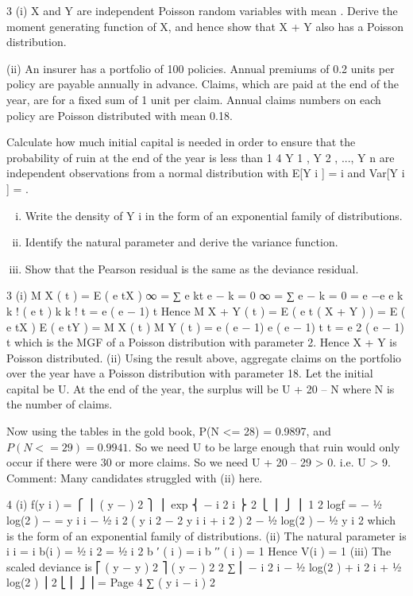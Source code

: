 \documentclass[a4paper,12pt]{article}
\begin{document}
\begin{enumerate}
3
(i) X and Y are independent Poisson random variables with mean \lambda. Derive the moment generating function of X, and hence show that X + Y also has a Poisson distribution.

(ii) An insurer has a portfolio of 100 policies. Annual premiums of 0.2 units per policy are payable annually in advance. Claims, which are paid at the end of the year, are for a fixed sum of 1 unit per claim. Annual claims numbers on each policy are Poisson distributed with mean 0.18.

Calculate how much initial capital is needed in order to ensure that the probability of ruin at the end of the year is less than 1%
4
Y 1 , Y 2 , ..., Y n are independent observations from a normal distribution with E[Y i ] = \mu i
and Var[Y i ] =  .
\begin{enumerate}[(i)]
\item  Write the density of Y i in the form of an exponential family of distributions. 
\item Identify the natural parameter and derive the variance function.
\item Show that the Pearson residual is the same as the deviance residual.
\end{enumerate}
3
(i)
M X ( t ) = E ( e tX )
∞
= ∑ e kt e −\lambda
k = 0
∞
= ∑ e −\lambda
k = 0
= e −\lambda e \lambda e
\lambda k
k !
( \lambda e t ) k
k !
t
= e \lambda ( e − 1)
t
Hence
M X + Y ( t ) = E ( e t ( X + Y ) )
= E ( e tX ) E ( e tY )
= M X ( t ) M Y ( t )
= e \lambda ( e − 1) e \lambda ( e − 1)
t
t
= e 2 \lambda ( e − 1)
t
which is the MGF of a Poisson distribution with parameter 2\lambda. Hence X + Y is
Poisson distributed.
(ii)
Using the result above, aggregate claims on the portfolio over the year have a Poisson distribution with parameter 18.
Let the initial capital be U. At the end of the year, the surplus will be U + 20 – N where N is the number of claims.

Now using the tables in the gold book, P(N <= 28) = 0.9897, and
$P(N < = 29) = 0.9941$.
So we need U to be large enough that ruin would only occur if there were 30
or more claims. So we need U + 20 – 29 > 0.
i.e. U > 9.
Comment: Many candidates struggled with (ii) here.

4
(i)
f(y i ) =
⎧ ⎪ ( y − \mu ) 2 ⎫ ⎪
exp ⎨ − i 2 i ⎬
2  \pi{}
⎩ ⎪
⎭ ⎪
1
2
logf = − 1⁄2 log(2 \pi\sigma ) −
=
y i \mu i − 1⁄2 \mu i 2
( y i 2 − 2 y i \mu i + \mu i 2 )
2 
− 1⁄2 log(2 \pi{} ) − 1⁄2
y i 2
which is the form of an exponential family of distributions.
(ii)
The natural parameter is \mu i
\theta i = \mu i
b(\theta i ) = 1⁄2 \mu i 2 = 1⁄2 \theta i 2
b ′ ( \theta i ) = \theta i
b ′′ ( \theta i ) = 1
Hence V(\mu i ) = 1
(iii)
The scaled deviance is
⎡ ( y − y ) 2
⎤
( y − \hat{\mu} ) 2
2 ∑ ⎢ − i 2 i − 1⁄2 log(2 \pi{} ) + i 2 i + 1⁄2 log(2 \pi{} ) ⎥
2  \sigma
⎣ ⎢
⎦ ⎥
=
Page 4
∑
( y i − \hat{\mu} i ) 2


\end{enumerate}
\end{document}
